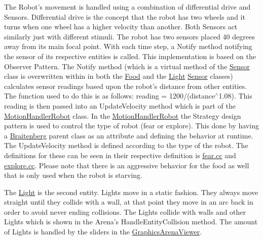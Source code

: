 The Robot’s movement is handled using a combination of differential drive and Sensors. Differential drive is the concept that the robot has two wheels and it turns when one wheel has a higher velocity than another. Both Sensors act similarly just with different stimuli. The robot has two sensors placed 40 degrees away from its main focal point. With each time step, a Notify method notifying the sensor of its respective entities is called. This implementation is based on the Observer Pattern. The Notify method (which is a virtual method of the \mbox{\hyperlink{class_sensor}{Sensor}} class is overwritten within in both the \mbox{\hyperlink{class_food}{Food}} and the \mbox{\hyperlink{class_light}{Light}} \mbox{\hyperlink{class_sensor}{Sensor}} classes) calculates sensor readings based upon the robot’s distance from other entities. The function used to do this is as follows\+: reading = 1200/(distance$^\wedge$1.08). This reading is then passed into an Update\+Velocity method which is part of the \mbox{\hyperlink{class_motion_handler_robot}{Motion\+Handler\+Robot}} class. In the \mbox{\hyperlink{class_motion_handler_robot}{Motion\+Handler\+Robot}} the Strategy design pattern is used to control the type of robot (fear or explore). This done by having a \mbox{\hyperlink{class_braitenberg}{Braitenberg}} parent class as an attribute and defining the behavior at runtime. The Update\+Velocity method is defined according to the type of the robot. The definitions for these can be seen in their respective definition is \mbox{\hyperlink{fear_8cc}{fear.\+cc}} and \mbox{\hyperlink{explore_8cc}{explore.\+cc}}. Please note that there is an aggressive behavior for the food as well that is only used when the robot is starving.

The \mbox{\hyperlink{class_light}{Light}} is the second entity. Lights move in a static fashion. They always move straight until they collide with a wall, at that point they move in an arc back in order to avoid never ending collisions. The Lights collide with walls and other Lights which is shown in the Arena’s Handle\+Entity\+Collision method. The amount of Lights is handled by the sliders in the \mbox{\hyperlink{class_graphics_arena_viewer}{Graphics\+Arena\+Viewer}}.

